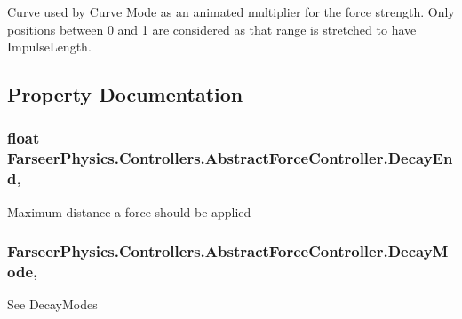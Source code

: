 Curve used by Curve Mode as an animated multiplier for the force strength. Only positions between 0 and 1 are considered as that range is stretched to have Impulse\+Length. 



\subsection{Property Documentation}
\hypertarget{class_farseer_physics_1_1_controllers_1_1_abstract_force_controller_ae217ee5b963ad0c5a6ccc4cbd6fe2423}{
\subsubsection[{Decay\+End}]{\setlength{\rightskip}{0pt plus 5cm}float Farseer\+Physics.\+Controllers.\+Abstract\+Force\+Controller.\+Decay\+End\hspace{0.3cm}{\ttfamily [get]}, {\ttfamily [set]}}}\label{class_farseer_physics_1_1_controllers_1_1_abstract_force_controller_ae217ee5b963ad0c5a6ccc4cbd6fe2423}


Maximum distance a force should be applied 

\hypertarget{class_farseer_physics_1_1_controllers_1_1_abstract_force_controller_a10a51f44dd3d177b9a6c61d5bede2b74}{
\subsubsection[{Decay\+Mode}]{ Farseer\+Physics.\+Controllers.\+Abstract\+Force\+Controller.\+Decay\+Mode\hspace{0.3cm}{\ttfamily [get]}, {\ttfamily [set]}}}\label{class_farseer_physics_1_1_controllers_1_1_abstract_force_controller_a10a51f44dd3d177b9a6c61d5bede2b74}


See Decay\+Modes 

